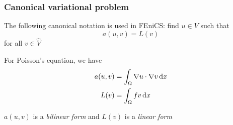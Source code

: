 \begin{frame}
  \frametitle{Canonical variational problem}

  The following canonical notation is used in FEniCS: find
  $u \in V$ such that
  \begin{equation*}
    a(u, v) = L(v)
  \end{equation*}
  for all $v \in \hat{V}$

  \bigskip

  For Poisson's equation, we have
  \begin{align*}
    a(u, v) &= \int_{\Omega} \nabla u \cdot \nabla v \, \mathrm{d}x
    \\
    L(v) &= \int_{\Omega} fv \, \mathrm{d}x
  \end{align*}

  \bigskip
  $a(u, v)$ is a \emph{bilinear form} and $L(v)$ is a \emph{linear form}

\end{frame}
